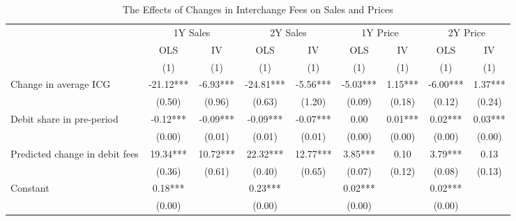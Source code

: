 \documentclass[11pt,english]{article}
\theoremstyle{remark}
\begin{document}
\begin{table}[H]
\caption{The Effects of Changes in Interchange Fees on Sales and Prices\label{tab:durbin-iv}}

\begin{centering}
{\tiny{
\def\sym#1{\ifmmode^{#1}\else\(^{#1}\)\fi}
\begin{tabular}{l*{8}{c}}
\toprule
                    &\multicolumn{2}{c}{1Y Sales}               &\multicolumn{2}{c}{2Y Sales}               &\multicolumn{2}{c}{1Y Price}               &\multicolumn{2}{c}{2Y Price}               \\
                    &\multicolumn{1}{c}{OLS}&\multicolumn{1}{c}{IV}&\multicolumn{1}{c}{OLS}&\multicolumn{1}{c}{IV}&\multicolumn{1}{c}{OLS}&\multicolumn{1}{c}{IV}&\multicolumn{1}{c}{OLS}&\multicolumn{1}{c}{IV}\\
                    &         (1)         &         (1)         &         (1)         &         (1)         &         (1)         &         (1)         &         (1)         &         (1)         \\
\midrule
Change in average ICG&      -21.12***&       -6.93***&      -24.81***&       -5.56***&       -5.03***&        1.15***&       -6.00***&        1.37***\\
                    &      (0.50)         &      (0.96)         &      (0.63)         &      (1.20)         &      (0.09)         &      (0.18)         &      (0.12)         &      (0.24)         \\

Debit share in pre-period&       -0.12***&       -0.09***&       -0.09***&       -0.07***&        0.00         &        0.01***&        0.02***&        0.03***\\
                    &      (0.00)         &      (0.01)         &      (0.01)         &      (0.01)         &      (0.00)         &      (0.00)         &      (0.00)         &      (0.00)         \\

Predicted change in debit fees&       19.34***&       10.72***&       22.32***&       12.77***&        3.85***&        0.10         &        3.79***&        0.13         \\
                    &      (0.36)         &      (0.61)         &      (0.40)         &      (0.65)         &      (0.07)         &      (0.12)         &      (0.08)         &      (0.13)         \\

Constant            &        0.18***&                     &        0.23***&                     &        0.02***&                     &        0.02***&                     \\
                    &      (0.00)         &                     &      (0.00)         &                     &      (0.00)         &                     &      (0.00)         &                     \\


\end{tabular}}}
\end{centering}
\end{table}
\end{document}
